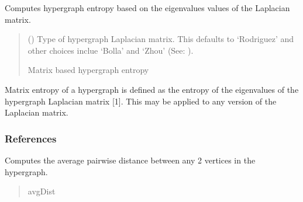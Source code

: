\documentclass[letterpaper,10pt,english]{sphinxmanual}
\begin{document}
\begin{fulllineitems}
\begin{fulllineitems}
\label{\detokenize{HAT:HAT.Hypergraph.Hypergraph.matrixEntropy}}
\pysigstartsignatures
{}
\pysigstopsignatures
\sphinxAtStartPar
Computes hypergraph entropy based on the eigenvalues values of the Laplacian matrix.
\begin{quote}\begin{description}
\sphinxAtStartPar
{} (\sphinxstyleliteralemphasis{\sphinxupquote{, }}) \textendash{} Type of hypergraph Laplacian matrix. This defaults to ‘Rodriguez’ and other
choices inclue ‘Bolla’ and ‘Zhou’ (See: ).

\sphinxAtStartPar
Matrix based hypergraph entropy

\sphinxAtStartPar
{}

\end{description}\end{quote}

\sphinxAtStartPar
Matrix entropy of a hypergraph is defined as the entropy of the eigenvalues of the
hypergraph Laplacian matrix {[}1{]}. This may be applied to any version of the Laplacian matrix.
\subsubsection*{References}

\end{fulllineitems}


\begin{fulllineitems}
\label{\detokenize{HAT:HAT.Hypergraph.Hypergraph.avgDistance}}
\pysigstartsignatures
{}
\pysigstopsignatures
\sphinxAtStartPar
Computes the average pairwise distance between any 2 vertices in the hypergraph.
\begin{quote}\begin{description}
\sphinxAtStartPar
avgDist


\end{description}
\end{quote}
\end{fulllineitems}
\end{fulllineitems}
\end{document}
